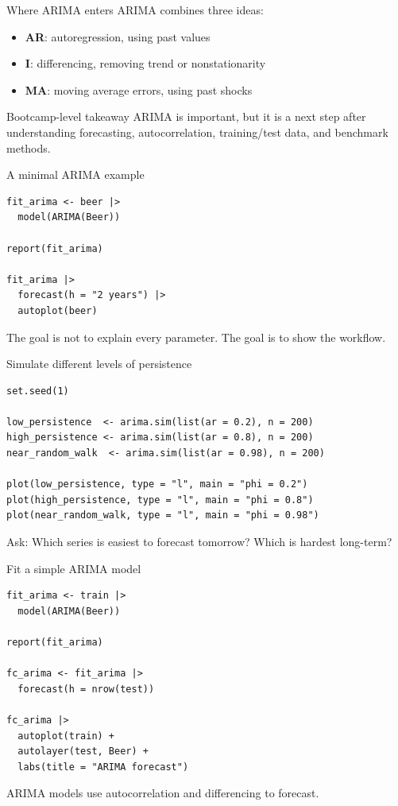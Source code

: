 \documentclass[aspectratio=169,11pt]{beamer}
\begin{document}
\begin{frame}{Where ARIMA enters}
ARIMA combines three ideas:
\begin{itemize}
  \item \textbf{AR}: autoregression, using past values
  \item \textbf{I}: differencing, removing trend or nonstationarity
  \item \textbf{MA}: moving average errors, using past shocks
\end{itemize}

\vspace{0.4cm}
\begin{block}{Bootcamp-level takeaway}
ARIMA is important, but it is a next step after understanding forecasting, autocorrelation, training/test data, and benchmark methods.
\end{block}
\end{frame}

\begin{frame}[fragile]{A minimal ARIMA example}
\begin{lstlisting}
fit_arima <- beer |>
  model(ARIMA(Beer))

report(fit_arima)

fit_arima |>
  forecast(h = "2 years") |>
  autoplot(beer)
\end{lstlisting}

\vspace{0.3cm}
The goal is not to explain every parameter. The goal is to show the workflow.
\end{frame}

\begin{frame}[fragile]{Simulate different levels of persistence}
\begin{lstlisting}
set.seed(1)

low_persistence  <- arima.sim(list(ar = 0.2), n = 200)
high_persistence <- arima.sim(list(ar = 0.8), n = 200)
near_random_walk  <- arima.sim(list(ar = 0.98), n = 200)

plot(low_persistence, type = "l", main = "phi = 0.2")
plot(high_persistence, type = "l", main = "phi = 0.8")
plot(near_random_walk, type = "l", main = "phi = 0.98")
\end{lstlisting}

\vspace{0.2cm}
Ask: Which series is easiest to forecast tomorrow? Which is hardest long-term?
\end{frame}

\begin{frame}[fragile]{Fit a simple ARIMA model}
\begin{lstlisting}
fit_arima <- train |>
  model(ARIMA(Beer))

report(fit_arima)

fc_arima <- fit_arima |>
  forecast(h = nrow(test))

fc_arima |>
  autoplot(train) +
  autolayer(test, Beer) +
  labs(title = "ARIMA forecast")
\end{lstlisting}

\vspace{0.2cm}
ARIMA models use autocorrelation and differencing to forecast.
\end{frame}
\end{document}
